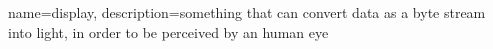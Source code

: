 {
  name=display,
  description={something that can convert data as a byte stream into light, in order to be perceived by an human eye}
}